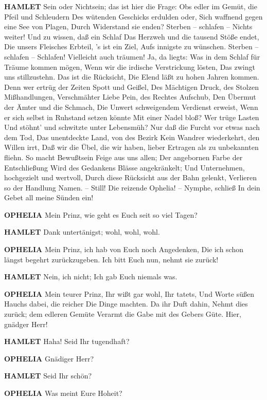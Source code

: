 \textbf{HAMLET}
Sein oder Nichtsein; das ist hier die Frage:
Obs edler im Gemüt, die Pfeil und Schleudern
Des wütenden Geschicks erdulden oder,
Sich waffnend gegen eine See von Plagen,
Durch Widerstand sie enden? Sterben -- schlafen --
Nichts weiter! Und zu wissen, daß ein Schlaf
Das Herzweh und die tausend Stöße endet,
Die unsers Fleisches Erbteil, 's ist ein Ziel,
Aufs innigste zu wünschen. Sterben -- schlafen --
Schlafen! Vielleicht auch träumen! Ja, da liegts:
Was in dem Schlaf für Träume kommen mögen,
Wenn wir die irdische Verstrickung lösten,
Das zwingt uns stillzustehn. Das ist die Rücksicht,
Die Elend läßt zu hohen Jahren kommen.
Denn wer ertrüg der Zeiten Spott und Geißel,
Des Mächtigen Druck, des Stolzen Mißhandlungen,
Verschmähter Liebe Pein, des Rechtes Aufschub,
Den Übermut der Ämter und die Schmach,
Die Unwert schweigendem Verdienst erweist,
Wenn er sich selbst in Ruhstand setzen könnte
Mit einer Nadel bloß? Wer trüge Lasten
Und stöhnt' und schwitzte unter Lebensmüh?
Nur daß die Furcht vor etwas nach dem Tod,
Das unentdeckte Land, von des Bezirk
Kein Wandrer wiederkehrt, den Willen irrt,
Daß wir die Übel, die wir haben, lieber
Ertragen als zu unbekannten fliehn.
So macht Bewußtsein Feige aus uns allen;
Der angebornen Farbe der Entschließung
Wird des Gedankens Blässe angekränkelt;
Und Unternehmen, hochgezielt und wertvoll,
Durch diese Rücksicht aus der Bahn gelenkt,
Verlieren so der Handlung Namen. -- Still!
Die reizende Ophelia! -- Nymphe, schließ
In dein Gebet all meine Sünden ein!

\textbf{OPHELIA}
Mein Prinz, wie geht es Euch seit so viel Tagen?

\textbf{HAMLET}
Dank untertänigst; wohl, wohl, wohl.

\textbf{OPHELIA}
Mein Prinz, ich hab von Euch noch Angedenken,
Die ich schon längst begehrt zurückzugeben.
Ich bitt Euch nun, nehmt sie zurück!

\textbf{HAMLET}
Nein, ich nicht;
Ich gab Euch niemals was.

\textbf{OPHELIA}
Mein teurer Prinz, Ihr wißt gar wohl, Ihr tatets,
Und Worte süßen Hauchs dabei, die reicher
Die Dinge machten. Da ihr Duft dahin,
Nehmt dies zurück; dem edleren Gemüte
Verarmt die Gabe mit des Gebers Güte.
Hier, gnädger Herr!

\textbf{HAMLET}
Haha! Seid Ihr tugendhaft?

\textbf{OPHELIA}
Gnädiger Herr?

\textbf{HAMLET}
Seid Ihr schön?

\textbf{OPHELIA}
Was meint Eure Hoheit?

